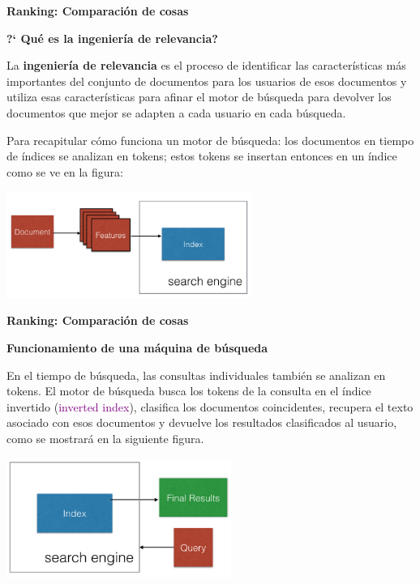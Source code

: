 \documentclass[11pt]{beamer}
\begin{document}
\begin{frame}{\textbf{\textcolor{green!55!blue}{Ranking: Comparaci\'on de cosas}}}

	
\textbf{?` Qu\'e es la ingenier\'ia de relevancia?}

\scriptsize{
La \textbf{ingenier\'ia de relevancia} es el proceso de identificar las caracter\'isticas m\'as importantes del conjunto de documentos para los usuarios de esos documentos y utiliza esas caracter\'isticas para afinar el motor de b\'usqueda para devolver los documentos que mejor se adapten a cada usuario en cada b\'usqueda.
 
Para recapitular c\'omo funciona un motor de b\'usqueda: los documentos en tiempo de \'indices se analizan en tokens; estos tokens se insertan entonces en un \'indice como se ve en la figura:

\begin{center}
\includegraphics[width=0.6\textwidth]{ML9.png}		
\end{center}
}
\end{frame}

\begin{frame}{\textbf{\textcolor{green!55!blue}{Ranking: Comparaci\'on de cosas}}}
	
\textbf{Funcionamiento de una m\'aquina de b\'usqueda} 

\vspace{0.2cm}

\scriptsize{En el tiempo de b\'usqueda, las consultas individuales tambi\'en se analizan en tokens. El motor de b\'usqueda busca los tokens de la consulta en el \'indice invertido (\textcolor{purple}{inverted index}), clasifica los documentos coincidentes, recupera el texto asociado con esos documentos y devuelve los resultados clasificados al usuario, como se mostrar\'a en la siguiente figura.
	


	
\begin{center}
\includegraphics[width=0.55\textwidth]{ML10.png}	
\end{center}


}
\end{frame}
\end{document}
